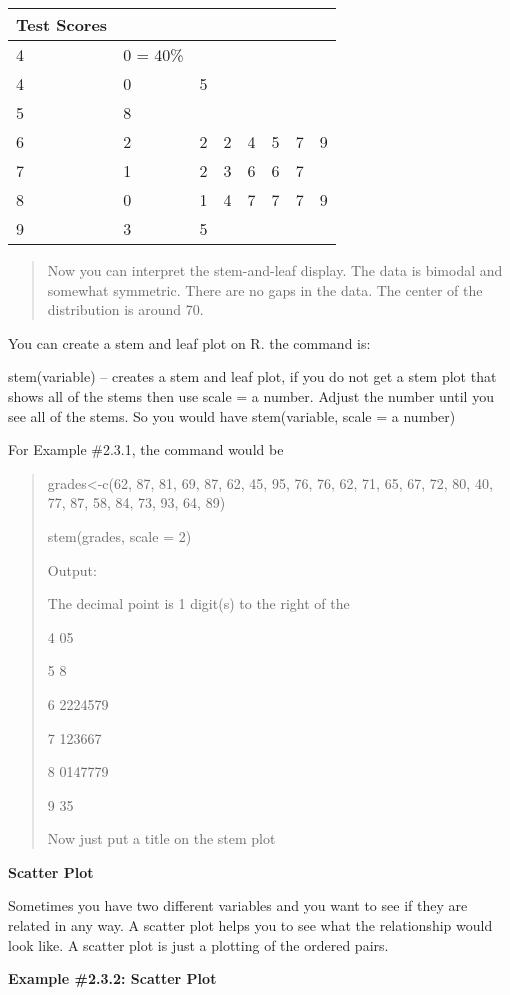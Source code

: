 \documentclass[]{book}
\begin{document}
\begin{longtable}[]{@{}llllllll@{}}
\toprule
Test Scores & & & & & & &\tabularnewline
\midrule
\endhead
4 & 0 = 40\% & & & & & &\tabularnewline
4 & 0 & 5 & & & & &\tabularnewline
5 & 8 & & & & & &\tabularnewline
6 & 2 & 2 & 2 & 4 & 5 & 7 & 9\tabularnewline
7 & 1 & 2 & 3 & 6 & 6 & 7 &\tabularnewline
8 & 0 & 1 & 4 & 7 & 7 & 7 & 9\tabularnewline
9 & 3 & 5 & & & & &\tabularnewline
\bottomrule
\end{longtable}

\begin{quote}
Now you can interpret the stem-and-leaf display. The data is bimodal
and somewhat symmetric. There are no gaps in the data. The center of
the distribution is around 70.
\end{quote}

You can create a stem and leaf plot on R. the command is:

stem(variable) -- creates a stem and leaf plot, if you do not get a stem
plot that shows all of the stems then use scale = a number. Adjust the
number until you see all of the stems. So you would have stem(variable,
scale = a number)

For Example \#2.3.1, the command would be

\begin{quote}
grades\textless{}-c(62, 87, 81, 69, 87, 62, 45, 95, 76, 76, 62, 71, 65, 67, 72,
80, 40, 77, 87, 58, 84, 73, 93, 64, 89)

stem(grades, scale = 2)

Output:

The decimal point is 1 digit(s) to the right of the \textbar{}

4 \textbar{} 05

5 \textbar{} 8

6 \textbar{} 2224579

7 \textbar{} 123667

8 \textbar{} 0147779

9 \textbar{} 35

Now just put a title on the stem plot
\end{quote}

\textbf{Scatter Plot}

Sometimes you have two different variables and you want to see if they
are related in any way. A scatter plot helps you to see what the
relationship would look like. A scatter plot is just a plotting of the
ordered pairs.

\textbf{Example \#2.3.2: Scatter Plot}
\end{document}
